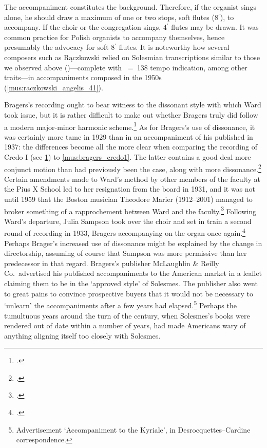   {\cite[unpaginated `Uwagi Praktyczne', p.~41]{RaczkowskiMszeGregorianskie1957}}
{The accompaniment constitutes the background. Therefore, if the organist sings alone, he should draw a maximum of one or two stops, soft flutes (8$^\prime$), to accompany. If the choir or the congregation sings, 4$^\prime$ flutes may be drawn.}
\noindent
It was common practice for Polish organists to accompany themselves, hence presumably the advocacy for soft 8$^\prime$ flutes.
It is noteworthy how several composers such as Rączkowski relied on Solesmian transcriptions similar to those we observed above ()---complete with \quaver~=~138 tempo indication, among other traits---in accompaniments composed in the 1950s (\cref{mus:raczkowski_angelis_41}).

Bragers's recording ought to bear witness to the dissonant style with which Ward took issue, but it is rather difficult to make out whether Bragers truly did follow a modern major-minor harmonic scheme.\footnote{\cite{DonovanCredoLU642014}.\label{fn:creed_recording}}
As for Bragers's use of dissonance, it was certainly more tame in 1929 than in an accompaniment of his published in 1937: the differences become all the more clear when comparing the recording of Credo I (see \cref{fn:creed_recording}) to \cref{mus:bragers_credo1}.
The latter contains a good deal more conjunct motion than had previously been the case, along with more dissonance.\footcite[93]{BragersAccompanimentVaticanKyriale1937}
Certain amendments made to Ward's method by other members of the faculty at the Pius X School led to her resignation from the board in 1931, and it was not until 1959 that the Boston musician Theodore Marier (1912--2001) managed to broker something of a rapprochement between Ward and the faculty.\footcite[17--22]{BrancaleoneJustineWardfostering2009}
Following Ward's departure, Julia Sampson took over the choir and set in train a second round of recording in 1933, Bragers accompanying on the organ once again.\footnote{\covid{}\cite{VictormatrixCS74994}.}
Perhaps Brager's increased use of dissonance might be explained by the change in directorship, assuming of course that Sampson was more permissive than her predecessor in that regard.
Bragers's publisher McLaughlin \&{} Reilly Co.\ advertised his published accompaniments to the American market in a leaflet claiming them to be in the `approved style' of Solesmes.
The publisher also went to great pains to convince prospective buyers that it would not be necessary to `unlearn' the accompaniments after a few years had elapsed.\footnote{Advertisement `Accompaniment to the Kyriale', \so{} in Desrocquettes--Cardine correspondence.}
Perhaps the tumultuous years around the turn of the century, when Solesmes's books were rendered out of date within a number of years, had made Americans wary of anything aligning itself too closely with Solesmes.

